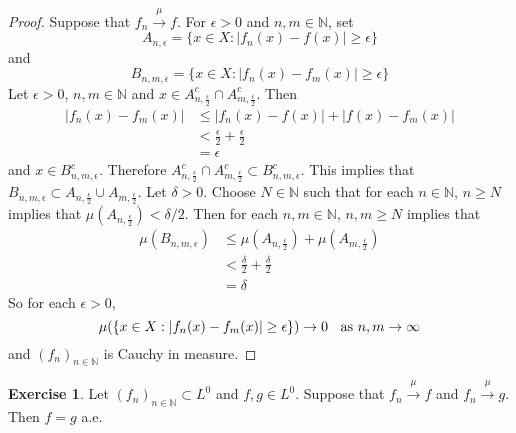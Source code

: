 \documentclass{book}
\theoremstyle{definition}
\newtheorem{ex}[definition]{Exercise}
\newcommand{\del}{\delta}
\newcommand{\ep}{\epsilon}
\newcommand{\N}{\mathbb{N}}
\DeclareMathOperator*{\0}{\mbf{0}}
\DeclareMathOperator*{\1}{\mbf{1}}
\newcommand{\conv}[1]{\xrightarrow{#1}}
\begin{document}
	\begin{proof}
	Suppose that $f_n \conv{\mu} f$. For $\ep >0$ and $n,m \in \N$, set 
	$$A_{n, \ep} = \{x \in X: |f_n(x) - f(x)| \geq \ep \}$$ 
	and 
	$$B_{n,m, \ep} = \{x \in X: |f_n(x) - f_m(x)| \geq \ep \}$$
	Let $\ep >0$, $n, m \in \N$ and $x \in A_{n, \frac{\ep}{2}}^c \cap A_{m, \frac{\ep}{2}}^c$. Then 
	\begin{align*}
	|f_n(x) - f_m(x)| 
	& \leq  |f_n(x) - f(x)| + |f(x) - f_m(x)| \\
	& < \frac{\ep}{2} + \frac{\ep}{2} \\
	&= \ep  
	\end{align*}
	and $x \in B_{n,m, \ep}^c$. Therefore $A_{n, \frac{\ep}{2}}^c \cap A_{m, \frac{\ep}{2}}^c \subset B_{n,m, \ep}^c$. This implies that $B_{n,m, \ep} \subset A_{n, \frac{\ep}{2}} \cup A_{m, \frac{\ep}{2}}$. Let $\del >0$. Choose $N \in \N$ such that for each $n \in \N$, $n \geq N$ implies that $\mu(A_{n, \frac{\ep}{2}}) < \del/2$. Then for each $n,m \in \N$, $n, m \geq N$ implies that 
	\begin{align*}
	\mu(B_{n,m, \ep}) 
	&\leq \mu(A_{n, \frac{\ep}{2}}) + \mu(A_{m, \frac{\ep}{2}}) \\
	& < \frac{\del}{2} + \frac{\del}{2} \\
	&= \del
	\end{align*}
	So for each $\ep >0$, $$\mu(\{x \in X: |f_n(x) - f_m(x)| \geq \ep \}) \rightarrow 0 \hspace{.2cm }\text{ as } n,m \rightarrow \infty$$  
	and $(f_n)_{n \in \N}$ is Cauchy in measure.
	\end{proof}
	
	\begin{ex}
	Let $(f_n)_{n \in \N} \subset L^0$ and $f, g \in L^0$. Suppose that $f_n \conv{\mu} f$ and $f_n \conv{\mu} g$. Then $f = g$ a.e. 
	\end{ex}
	
\end{document}
